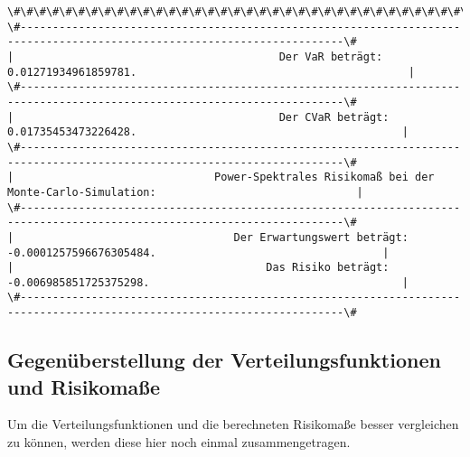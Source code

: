 \documentclass[paper=landscape]{scrartcl}
\begin{document}
\begin{Verbatim}[commandchars=\\\{\}]
\#\#\#\#\#\#\#\#\#\#\#\#\#\#\#\#\#\#\#\#\#\#\#\#\#\#\#\#\#\#\#\#\#\#\#\#\#\#\#\#\#\#\#\#\#\#\#\#\#\#\#\#\#\#\#\#\#\#\#\#\#\#\#\#\#\#\#\#\#\#\#\#\#\#\#\#\#\#\#\#\#\#\#\#\#\#\#\#\#\#\#\#\#\#\#\#\#\#\#\#\#\#\#\#\#\#\#\#\#\#\#\#\#\#\#\#\#\#\#\#\#\#
\#------------------------------------------------------------------------------------------------------------------------\#
|                                         Der VaR beträgt: 0.01271934961859781.                                          | 
\#------------------------------------------------------------------------------------------------------------------------\#
|                                         Der CVaR beträgt: 0.01735453473226428.                                         | 
\#------------------------------------------------------------------------------------------------------------------------\#
|                               Power-Spektrales Risikomaß bei der Monte-Carlo-Simulation:                               | 
\#------------------------------------------------------------------------------------------------------------------------\#
|                                  Der Erwartungswert beträgt: -0.0001257596676305484.                                   | 
|                                       Das Risiko beträgt: -0.006985851725375298.                                       | 
\#------------------------------------------------------------------------------------------------------------------------\#

    \end{Verbatim}

    \hypertarget{gegenuxfcberstellung-der-verteilungsfunktionen-und-risikomauxdfe}{%
\subsection{Gegenüberstellung der Verteilungsfunktionen und
Risikomaße}\label{gegenuxfcberstellung-der-verteilungsfunktionen-und-risikomauxdfe}}

Um die Verteilungsfunktionen und die berechneten Risikomaße besser
vergleichen zu können, werden diese hier noch einmal zusammengetragen.
\end{document}
